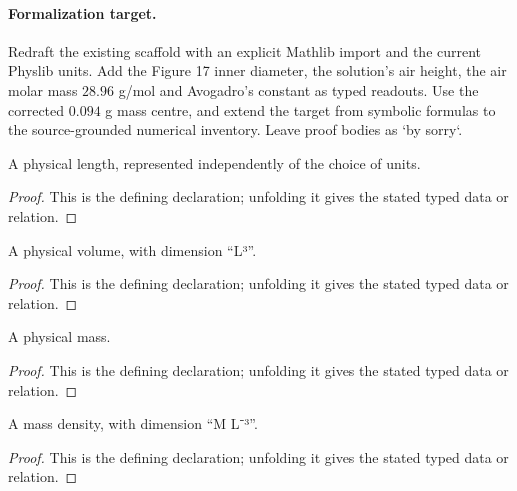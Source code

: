 \paragraph{Formalization target.}
Redraft the existing scaffold with an explicit Mathlib import and the current
Physlib units.  Add the Figure 17 inner diameter, the solution's air height,
the air molar mass \(28.96\) g/mol and Avogadro's constant as typed readouts.
Use the corrected \(0.094\) g mass centre, and extend the target from symbolic
formulas to the source-grounded numerical inventory.  Leave proof bodies as
`by sorry`.

\begin{definition}[Length]
  \label{decl:physics:IPhO_2026_4_A_1:Length}
  A physical length, represented independently of the choice of units.
\end{definition}
\begin{proof}
  This is the defining declaration; unfolding it gives the stated typed data or relation.
\end{proof}

\begin{definition}[Volume]
  \label{decl:physics:IPhO_2026_4_A_1:Volume}
  A physical volume, with dimension “L³”.
\end{definition}
\begin{proof}
  This is the defining declaration; unfolding it gives the stated typed data or relation.
\end{proof}

\begin{definition}[Mass]
  \label{decl:physics:IPhO_2026_4_A_1:Mass}
  A physical mass.
\end{definition}
\begin{proof}
  This is the defining declaration; unfolding it gives the stated typed data or relation.
\end{proof}

\begin{definition}[MassDensity]
  \label{decl:physics:IPhO_2026_4_A_1:MassDensity}
  A mass density, with dimension “M L⁻³”.
\end{definition}
\begin{proof}
  This is the defining declaration; unfolding it gives the stated typed data or relation.
\end{proof}

